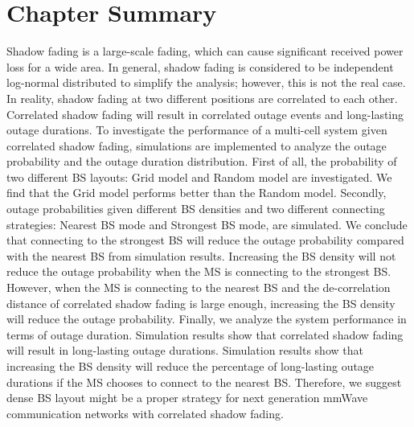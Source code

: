  \section{Chapter Summary}
 \label{4:Conclusion}
 Shadow fading is a large-scale fading, which can cause significant received power loss for a wide area. In general, shadow fading is considered to be independent log-normal distributed to simplify the analysis; however, this is not the real case. In reality, shadow fading at two different positions are correlated to each other. Correlated shadow fading will result in correlated outage events and long-lasting outage durations. To investigate the performance of a multi-cell system given correlated shadow fading, simulations are implemented to analyze the outage probability and the outage duration distribution. First of all, the probability of two different BS layouts: Grid model and Random model are investigated. We find that the Grid model performs better than the Random model. Secondly, outage probabilities given different BS densities and two different connecting strategies: Nearest BS mode and Strongest BS mode, are simulated. We conclude that connecting to the strongest BS will reduce the outage probability compared with the nearest BS from simulation results. Increasing the BS density will not reduce the outage probability when the MS is connecting to the strongest BS. However, when the MS is connecting to the nearest BS and the de-correlation distance of correlated shadow fading is large enough, increasing the BS density will reduce the outage probability.  Finally, we analyze the system performance in terms of outage duration. Simulation results show that correlated shadow fading will result in long-lasting outage durations. Simulation results show that increasing the BS density will reduce the percentage of long-lasting outage durations if the MS chooses to connect to the nearest BS. Therefore, we suggest dense BS layout might be a proper strategy for next generation mmWave communication networks with correlated shadow fading.
 

